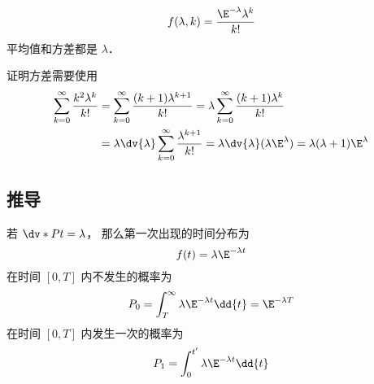 
\begin{issues}
\issueDraft
\end{issues}

\begin{equation}
f(\lambda, k) = \frac{\E^{-\lambda}\lambda^k}{k!}
\end{equation}
平均值和方差都是 $\lambda$．

证明方差需要使用
\begin{equation}
\begin{aligned}
\sum_{k=0}^\infty \frac{k^2\lambda^{k}}{k!}
&= \sum_{k=0}^\infty \frac{(k+1)\lambda^{k+1}}{k!}
= \lambda \sum_{k=0}^\infty \frac{(k+1)\lambda^k}{k!}\\
&= \lambda\dv{\lambda} \sum_{k=0}^\infty \frac{\lambda^{k+1}}{k!}
= \lambda \dv{\lambda} (\lambda \E^{\lambda})
= \lambda(\lambda+1)\E^{\lambda}
\end{aligned}
\end{equation}

\subsection{推导}
若 $\dv*{P}{t} = \lambda$， 那么第一次出现的时间分布为
\begin{equation}
f(t) = \lambda\E^{-\lambda t}
\end{equation}
在时间 $[0,T]$ 内不发生的概率为
\begin{equation}
P_0 = \int_T^{\infty} \lambda\E^{-\lambda t} \dd{t} = \E^{-\lambda T}
\end{equation}
在时间 $[0,T]$ 内发生一次的概率为
\begin{equation}
P_1 = \int_{0}^{t'} \lambda\E^{-\lambda t} \dd{t}
\end{equation}

